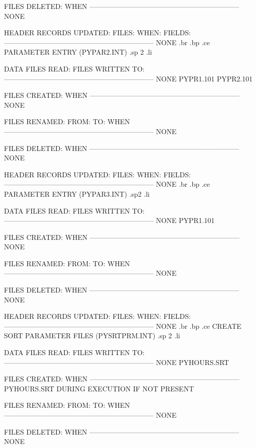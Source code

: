 FILES DELETED:			  WHEN
-----------------------------------------------------------------
      NONE


HEADER RECORDS UPDATED:
FILES:		 WHEN:		    FIELDS:
-----------------------------------------------------------------
      NONE
.br
.bp
.ce
PARAMETER ENTRY  (PYPAR2.INT)
.sp 2
.li

DATA FILES READ:		   FILES WRITTEN TO:
-----------------------------------------------------------------
       NONE				PYPR1.101
					PYPR2.101

FILES CREATED:			  WHEN
-----------------------------------------------------------------
       NONE


FILES RENAMED:
  FROM:        TO:		  WHEN
-----------------------------------------------------------------
      NONE


FILES DELETED:			  WHEN
-----------------------------------------------------------------
      NONE


HEADER RECORDS UPDATED:
FILES:		 WHEN:		    FIELDS:
-----------------------------------------------------------------
      NONE
.br
.bp
.ce
PARAMETER ENTRY  (PYPAR3.INT)
.sp2
.li

DATA FILES READ:		   FILES WRITTEN TO:
-----------------------------------------------------------------
       NONE				PYPR1.101


FILES CREATED:			  WHEN
-----------------------------------------------------------------
       NONE


FILES RENAMED:
  FROM:        TO:		  WHEN
-----------------------------------------------------------------
      NONE


FILES DELETED:			  WHEN
-----------------------------------------------------------------
      NONE


HEADER RECORDS UPDATED:
FILES:		 WHEN:		    FIELDS:
-----------------------------------------------------------------
      NONE
.br
.bp
.ce
CREATE SORT PARAMETER FILES   (PYSRTPRM.INT)
.sp 2
.li

DATA FILES READ:		   FILES WRITTEN TO:
-----------------------------------------------------------------
       NONE				PYHOURS.SRT

FILES CREATED:			  WHEN
-----------------------------------------------------------------
       PYHOURS.SRT	      DURING EXECUTION IF NOT PRESENT


FILES RENAMED:
  FROM:        TO:		  WHEN
-----------------------------------------------------------------
     NONE


FILES DELETED:			  WHEN
-----------------------------------------------------------------
      NONE


